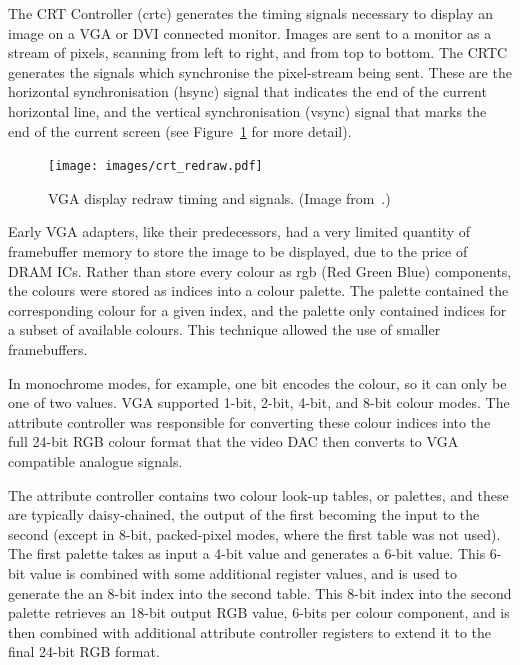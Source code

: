 The CRT Controller (\gls{crtc})
generates the timing signals necessary to display an image on a VGA or DVI
connected monitor. Images are sent to a monitor as a stream of pixels, scanning
from left to right, and from top to bottom. The CRTC generates the signals which
synchronise the pixel-stream being sent. These are the horizontal
synchronisation (\gls{hsync}) signal that indicates the end of the current horizontal line, and the
vertical synchronisation (\gls{vsync}) signal that marks the end of the current screen (see
Figure~\ref{INTRO_CRT_Redraw} for more detail).

\begin{figure}[h!]
\begin{center}
\texttt{[image: images/crt\_redraw.pdf]}
\end{center}
\caption[VGA display redraw timing and signals]{VGA display redraw timing and
signals. (Image from~\cite{knutsson:fbg}.)}
\label{INTRO_CRT_Redraw}
\end{figure}

Early VGA adapters, like their predecessors, had a very limited quantity of
framebuffer memory to store the image to be displayed, due to the price of DRAM
ICs. Rather than store every colour as \gls{rgb} (Red Green Blue) components, the colours were stored as indices into
a colour palette. The palette contained the corresponding colour for a given
index, and the palette only contained indices for a subset of available colours.
This technique allowed the use of smaller framebuffers.

In monochrome modes, for example, one bit encodes the colour, so it can only be
one of two values. VGA supported 1-bit, 2-bit, 4-bit, and 8-bit colour modes. The
attribute controller was responsible for converting these colour indices into the
full 24-bit RGB colour format that the video DAC then converts to VGA compatible
analogue signals.

The attribute controller contains two colour look-up tables, or palettes, and
these are typically daisy-chained, the output of the first becoming the input to
the second (except in 8-bit, packed-pixel modes, where the first table was not
used). The first palette takes as input a 4-bit value and generates a 6-bit
value. This 6-bit value is combined with some additional register values, and is
used to generate the an 8-bit index into the second table. This 8-bit index into
the second palette retrieves an 18-bit output RGB value, 6-bits per colour
component, and is then combined with additional attribute controller registers to
extend it to the final 24-bit RGB format.

